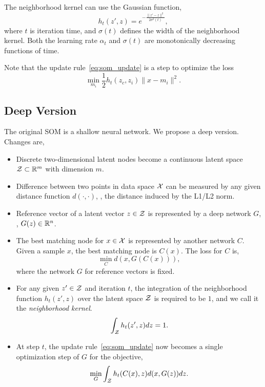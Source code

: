 The neighborhood kernel can use the Gaussian function,
\begin{equation}
    h_t(z',z) = e^{-\frac{\|z' - z\|^2}{2\sigma^2(t)}},
\end{equation}
where \(t\) is iteration time,
and \(\sigma(t)\) defines the width of the neighborhood kernel.
Both the learning rate \(\alpha_t\) and \(\sigma(t)\) are monotonically decreasing functions of time.

Note that the update rule~\eqref{eq:som_update} is a step to optimize the loss
\begin{equation}
    \min_{m_i} \frac{1}{2}h_t(z_c,z_i)\|x-m_i\|^2.
\end{equation}

\subsection{Deep Version}

The original SOM is a shallow neural network.
We propose a deep version.
Changes are,

\begin{itemize}
    \item Discrete two-dimensional latent nodes become a continuous latent space \(\mathcal{Z}\subset{\mathbb{R}}^m\) with dimension \(m\).
    \item Difference between two points in data space \(\mathcal{X}\) can be measured by any given distance function \(d(\cdot,\cdot)\),
        \eg, the distance induced by the L1/L2 norm.
    \item Reference vector of a latent vector \(z\in\mathcal{Z}\) is represented by a deep network \(G\), \ie, \(G(z)\in{\mathbb{R}}^n\).
    \item The best matching node for \(x\in\mathcal{X}\) is represented by another network \(C\).
        Given a sample \(x\),
        the best matching node is \(C(x)\).
        The loss for \(C\) is,
        \begin{equation}\label{eq:soae_c}
            \min_C d(x, G(C(x))),
        \end{equation}
        where the network \(G\) for reference vectors is fixed.
    \item For any given \(z'\in\mathcal{Z}\) and iteration \(t\),
        the integration of the neighborhood function \(h_t(z',z)\) over the latent space \(\mathcal{Z}\) is required to be \(1\),
        and we call it the \emph{neighborhood kernel}.
        \begin{equation}
            \int_{\mathcal{Z}} h_t(z',z)dz = 1.
        \end{equation}
    \item At step \(t\), the update rule~\eqref{eq:som_update} now becomes a single optimization step of \(G\) for the objective,
        \begin{equation}\label{eq:deep_update}
            \min_G \int_{\mathcal{Z}}h_t(C(x), z)d(x, G(z))dz.
        \end{equation}
\end{itemize}

